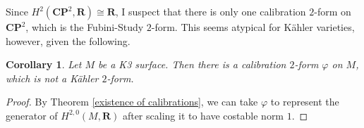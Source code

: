 \documentclass[reqno,11pt]{amsart}
\newcommand{\RR}{\mathbf{R}}
\newcommand{\CC}{\mathbf{C}}
\newcommand{\PP}{\mathbf P}
\newtheorem{corollary}[theorem]{Corollary}
\theoremstyle{definition}
\numberwithin{equation}{section}
\begin{document}
Since $H^2(\CC \PP^2, \RR) \cong \RR$, I suspect that there is only one calibration $2$-form on $\CC \PP^2$, which is the Fubini-Study $2$-form.
This seems atypical for K\"ahler varieties, however, given the following.

\begin{corollary}
Let $M$ be a K3 surface. Then there is a calibration $2$-form $\varphi$ on $M$, which is not a K\"ahler $2$-form.
\end{corollary}
\begin{proof}
By Theorem \ref{existence of calibrations}, we can take $\varphi$ to represent the generator of $H^{2, 0}(M, \RR)$ after scaling it to have costable norm $1$.
\end{proof}


\printbibliography
\end{document}
